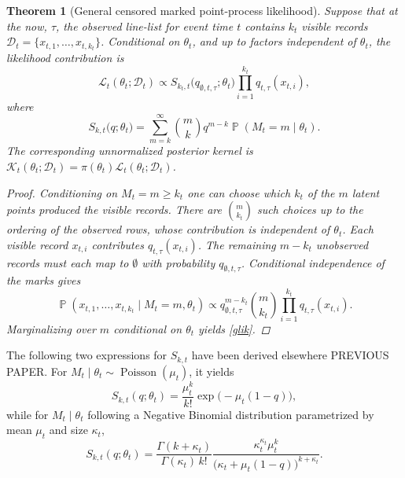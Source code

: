 \documentclass{article}
\newtheorem{theorem}{Theorem}
\theoremstyle{definition}
\theoremstyle{remark}
\newcommand{\Pois}{\operatorname{Poisson}}
\newcommand{\Prb}{\operatorname{\mathbb{P}}}
\begin{document}
\begin{theorem}[General censored marked point-process likelihood] 
Suppose that at the now, $\tau$, the observed line-list for event time $t$ contains $k_t$ visible records $\mathcal D_t=\{x_{t,1},\ldots,x_{t,k_t}\}$. Conditional on $\theta_t$, and up to factors independent of $\theta_t$, the likelihood contribution is
\begin{equation}\label{glik}
    \mathcal{L}_t(\theta_t;\mathcal D_t) 
    \propto 
    S_{k_t,t}\big(q_{\emptyset, t, \tau};\theta_t\big) 
    \prod\limits_{i = 1}^{k_t} q_{t,\tau}(x_{t,i}),
\end{equation}
where
\begin{equation}
    S_{k,t}\big(q;\theta_t\big) = \sum\limits_{m=k}^{\infty} \binom{m}{k} q^{m-k} \Prb(M_t = m\mid\theta_t).
\end{equation}
The corresponding unnormalized posterior kernel is $\mathcal K_t(\theta_t;\mathcal D_t)=\pi(\theta_t)\mathcal L_t(\theta_t;\mathcal D_t)$.
\begin{proof}
Conditioning on $M_t=m\geq k_t$ one can choose which $k_t$ of the $m$ latent points produced the visible records. There are $\binom{m}{k_t}$ such choices up to the ordering of the observed rows, whose contribution is independent of $\theta_t$. Each visible record $x_{t,i}$ contributes $q_{t,\tau}(x_{t,i})$. The remaining $m-k_t$ unobserved records must each map to $\emptyset$ with probability $q_{\emptyset, t, \tau}$. Conditional independence of the marks gives
\begin{equation}
    \Prb(x_{t,1},\dots,x_{t,k_t}\mid M_t=m,\theta_t)
    \propto    
    q_{\emptyset,t,\tau}^{m-k_t} \binom{m}{k_t}
    \prod_{i=1}^{k_t}q_{t,\tau}(x_{t,i}).
\end{equation}
Marginalizing over $m$ conditional on $\theta_t$ yields \eqref{glik}.
\end{proof}
\end{theorem}

The following two expressions for $S_{k,t}$ have been derived elsewhere {\color{red} PREVIOUS PAPER}. For $M_t\mid\theta_t\sim\Pois(\mu_t)$, it yields
\begin{equation}\label{poissonS}
    S_{k,t}(q;\theta_t) = \dfrac{\mu_t^k}{k!} \exp\big(-\mu_t(1 - q)\big),
\end{equation}
while for $M_t\mid\theta_t$ following a Negative Binomial distribution parametrized by mean $\mu_t$ and size $\kappa_t$,
\begin{equation}\label{negbinS}
    S_{k,t}(q;\theta_t) 
    = 
    \dfrac{\Gamma(k + \kappa_t)}{\Gamma(\kappa_t)\, k!} 
    \dfrac{\kappa_t^{\kappa_t}\mu_t^k}
    {\big(\kappa_t + \mu_t (1 - q)\big)^{k + \kappa_t}}.
\end{equation}
\end{document}
